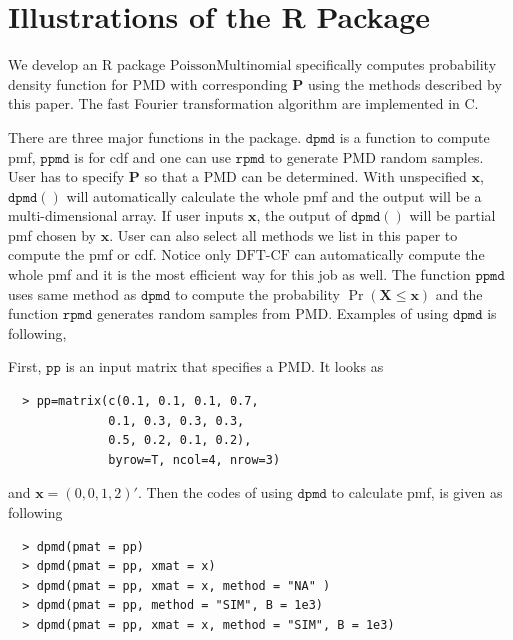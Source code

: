 \documentclass[12pt]{article}
\newcommand{\Pmat}{\mathbf{P}}
\newcommand{\PMD}{\textrm{PMD}}
\newcommand{\Xvec}{\boldsymbol{X}}
\newcommand{\xvec}{\boldsymbol{x}}
\newcommand{\code}{\texttt}
\newcommand{\dft}{{\textrm{DFT-CF}}}
\begin{document}
\section{Illustrations of the R Package}\label{sec:rpackage}
We develop an R package $\textrm{PoissonMultinomial}$ specifically computes probability density function for $\PMD$ with corresponding $\Pmat$ using the methods described by this paper. The fast Fourier transformation algorithm are implemented in C.

There are three major functions in the package. $\code{dpmd}$ is a function to compute pmf, $\code{ppmd}$ is for cdf and one can use $\code{rpmd}$ to generate $\PMD$ random samples. User has to specify $\Pmat$ so that a $\PMD$ can be determined. With unspecified $\xvec$, $\code{dpmd}( )$ will automatically calculate the whole pmf and the output will be a multi-dimensional array. If user inputs $\xvec$, the output of $\code{dpmd}( )$ will be partial pmf chosen by $\xvec$. User can also select all methods we list in this paper to compute the pmf or cdf. Notice only $\dft$ can automatically compute the whole pmf and it is the most efficient way for this job as well. The function $\code{ppmd}$ uses same method as $\code{dpmd}$ to compute the probability $\Pr(\Xvec \leq \xvec)$ and the function $\code{rpmd}$ generates random samples from $\PMD$.  Examples of using $\code{dpmd}$ is following,

First, $\code{pp}$ is an input matrix that specifies a $\PMD$. It looks as
\begin{verbatim}
  > pp=matrix(c(0.1, 0.1, 0.1, 0.7,
              0.1, 0.3, 0.3, 0.3,
              0.5, 0.2, 0.1, 0.2),
              byrow=T, ncol=4, nrow=3)
\end{verbatim}
and $\xvec=(0,0,1,2)'$. Then the codes of using $\code{dpmd}$ to calculate pmf, is given as following
\begin{verbatim}
  > dpmd(pmat = pp)
  > dpmd(pmat = pp, xmat = x)
  > dpmd(pmat = pp, xmat = x, method = "NA" )
  > dpmd(pmat = pp, method = "SIM", B = 1e3)
  > dpmd(pmat = pp, xmat = x, method = "SIM", B = 1e3)
\end{verbatim}
\end{document}
